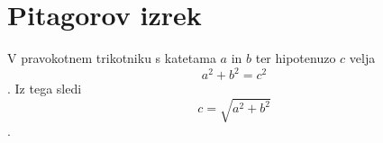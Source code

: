 \documentclass{article}
\begin{document}
\section*{Pitagorov izrek}
V pravokotnem trikotniku s katetama \(a\) in \(b\) ter hipotenuzo \(c\) velja
\[ a^2 + b^2 = c^2 \]. Iz tega sledi \[c = \sqrt{a^2 + b^2} \].
\end{document}
